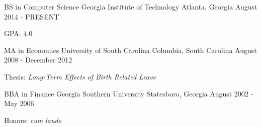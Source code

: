 

\begin{cventries}

  \cventry
    {BS in Computer Science} %
    {Georgia Institute of Technology} %
    {Atlanta, Georgia} %
    {August 2014 - PRESENT} %
    {
      \begin{cvitems} %
        \item {GPA: 4.0}
      \end{cvitems}
    }
    
    \cventry
    {MA in Economics} %
    {University of South Carolina} %
    {Columbia, South Carolina} %
    {August 2008 - December 2012} %
    {
      \begin{cvitems} %
        \item {Thesis: \textit{Long-Term Effects of Birth Related Leave}}
      \end{cvitems}
    }
    
    \cventry
    {BBA in Finance} %
    {Georgia Southern University} %
    {Statesboro, Georgia} %
    {August 2002 - May 2006} %
    {
      \begin{cvitems} %
        \item {Honors: \textit{cum laude}}
      \end{cvitems}
    }

\end{cventries}
